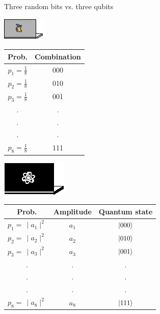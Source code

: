 \documentclass[10pt]{beamer}
\begin{document}
{
\begin{frame}[fragile]{Three random bits vs. three qubits}

\begin{minipage}[c]{0.39\textwidth}
\centering
\includegraphics[scale=1.9]{Vectors/laptop_c.eps}\\
\vspace{0.4cm}
\begin{tabular}{c | c}
	Prob. & Combination \\
	\midrule
	$p_1 = \frac{1}{8}$ & 000 \\
	$p_2= \frac{1}{8}$ & 010 \\
	$p_3= \frac{1}{8}$ & 001 \\
	. & .\\
	. & . \\
	. & . \\
	$p_8= \frac{1}{8}$ & 111 \\
	
\end{tabular}
\end{minipage}%
\begin{minipage}[c]{0.59\textwidth}
\centering
\includegraphics[scale=1.2]{Vectors/laptop_q.eps}\\
\vspace{0.5cm}
\begin{tabular}{c | c | c}
	Prob. & Amplitude & Quantum state \\
	\midrule
	$p_1 =\, \mid a_1\mid^2$ & $a_1$ & $\ket{000}$ \\
	$p_2 =\,\mid a_2\mid^2$ & $a_2$ & $\ket{010}$ \\
	$p_3 =\, \mid a_3\mid^2$ & $a_3$ & $\ket{001}$ \\
	. & .  & .\\
	. & . & .\\
	. & . & .\\
	$p_8 =\, \mid a_8\mid^2$ & $a_8$ & $\ket{111}$ \\
	
\end{tabular}
\end{minipage}
\end{frame}
}
\end{document}
